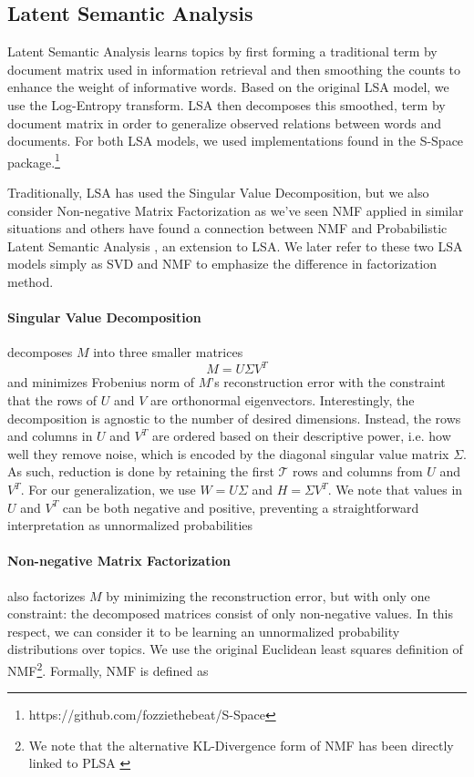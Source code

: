 \subsection{Latent Semantic Analysis}

Latent Semantic Analysis \cite{landauer97solution,landauer98lsa} learns topics
by first forming a traditional term by document matrix used in information
retrieval and then smoothing the counts to enhance the weight of informative
words.  Based on the original LSA model, we use the Log-Entropy transform.  
LSA then decomposes this smoothed, term by document matrix in order to
generalize observed relations between words and documents.  For both LSA models,
we used implementations found in the S-Space
package.\footnote{https://github.com/fozziethebeat/S-Space}

Traditionally, LSA has used the Singular Value Decomposition, but we also
consider Non-negative Matrix Factorization as we've seen NMF applied in similar
situations \cite{pauca04nmfIR} and others have found a connection between NMF
and Probabilistic Latent Semantic Analysis \cite{ding08nmfPlsa}, an extension to
LSA.  We later refer to these two LSA models simply as SVD and NMF to emphasize
the difference in factorization method.

\paragraph{Singular Value Decomposition}
decomposes $M$ into three smaller matrices
$$
M=U \Sigma V^{T}
$$
\noindent
and minimizes Frobenius norm of $M$'s reconstruction error with the constraint
that the rows of $U$ and $V$ are orthonormal eigenvectors.  Interestingly, the
decomposition is agnostic to the number of desired dimensions.  Instead, the
rows and columns in $U$ and $V^T$ are ordered based on their descriptive power,
i.e. how well they remove noise, which is encoded by the diagonal singular value
matrix $\Sigma$.  As such, reduction is done by retaining the first
$\mathcal{T}$ rows and columns from $U$ and $V^T$.  For our generalization, we
use $W=U \Sigma$ and $H = \Sigma V^T$.  We note that values in $U$ and $V^T$ can
be both negative and positive, preventing a straightforward interpretation as
unnormalized probabilities

\paragraph{Non-negative Matrix Factorization}
also factorizes $M$ by minimizing the reconstruction error, but with only one
constraint: the decomposed matrices consist of only non-negative values.
In this respect, we can consider it to be
learning an unnormalized probability distributions over topics.  We use the original
Euclidean least squares definition of NMF\footnote{We note that the
alternative KL-Divergence form of NMF has been directly linked to PLSA
\cite{ding08nmfPlsa}}.  Formally, NMF is defined as

